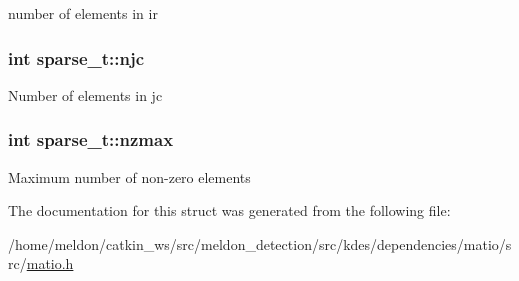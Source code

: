 number of elements in ir \hypertarget{structsparse__t_aa0ef6a0c8be3ad0e3a222371e68f7dd4}{
\subsubsection[{njc}]{\setlength{\rightskip}{0pt plus 5cm}int sparse\-\_\-t\-::njc}}\label{structsparse__t_aa0ef6a0c8be3ad0e3a222371e68f7dd4}
Number of elements in jc \hypertarget{structsparse__t_afd116055ad6a18c27b80333fdac45827}{
\subsubsection[{nzmax}]{\setlength{\rightskip}{0pt plus 5cm}int sparse\-\_\-t\-::nzmax}}\label{structsparse__t_afd116055ad6a18c27b80333fdac45827}
Maximum number of non-\/zero elements 

The documentation for this struct was generated from the following file\-:\begin{DoxyCompactItemize}
\item 
/home/meldon/catkin\-\_\-ws/src/meldon\-\_\-detection/src/kdes/dependencies/matio/src/\hyperlink{matio_8h}{matio.\-h}\end{DoxyCompactItemize}
